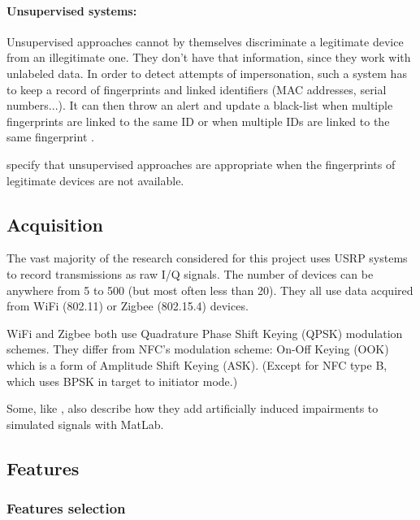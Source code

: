 \paragraph{Unsupervised systems:} Unsupervised approaches cannot by themselves discriminate a legitimate device from an illegitimate one. They don't have that information, since they work with unlabeled data. In order to detect attempts of impersonation, such a system has to keep a record of fingerprints and linked identifiers (MAC addresses, serial numbers...). It can then throw an alert and update a black-list when multiple fingerprints are linked to the same ID or when multiple IDs are linked to the same fingerprint \cite{xu_device_2015, nguyen_device_2011}.

\textcite{xu_device_2015} specify that unsupervised approaches are appropriate when the fingerprints of legitimate devices are not available.

\subsection{Acquisition}

The vast majority of the research considered for this project uses USRP systems to record transmissions as raw I/Q signals. The number of devices can be anywhere from 5 to 500 (but most often less than 20). They all use data acquired from WiFi (802.11) or Zigbee (802.15.4) devices. \cite{riyaz_deep_2018, oyedare_estimating_2019, youssef_machine_2017, morin_transmitter_2019, sankhe_no_2019, nguyen_device_2011}

WiFi and Zigbee both use Quadrature Phase Shift Keying (QPSK) modulation schemes. They differ from NFC's modulation scheme: On-Off Keying (OOK) which is a form of Amplitude Shift Keying (ASK). (Except for NFC type B, which uses BPSK in target to initiator mode.)

Some, like \textcite{sankhe_no_2019}, also describe how they add artificially induced impairments to simulated signals with MatLab.

\subsection{Features}

\subsubsection{Features selection}

